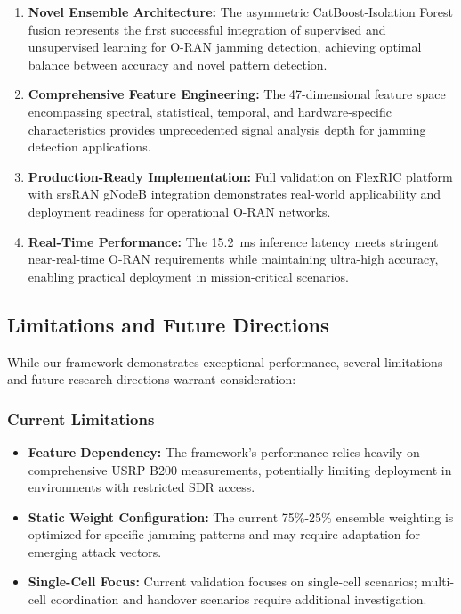 \documentclass[journal]{IEEEtran}
\begin{document}
\begin{enumerate}
    \item \textbf{Novel Ensemble Architecture:} The asymmetric CatBoost-Isolation Forest fusion represents the first successful integration of supervised and unsupervised learning for O-RAN jamming detection, achieving optimal balance between accuracy and novel pattern detection.
    
    \item \textbf{Comprehensive Feature Engineering:} The 47-dimensional feature space encompassing spectral, statistical, temporal, and hardware-specific characteristics provides unprecedented signal analysis depth for jamming detection applications.
    
    \item \textbf{Production-Ready Implementation:} Full validation on FlexRIC platform with srsRAN gNodeB integration demonstrates real-world applicability and deployment readiness for operational O-RAN networks.
    
    \item \textbf{Real-Time Performance:} The 15.2~ms inference latency meets stringent near-real-time O-RAN requirements while maintaining ultra-high accuracy, enabling practical deployment in mission-critical scenarios.
\end{enumerate}

\subsection{Limitations and Future Directions}

While our framework demonstrates exceptional performance, several limitations and future research directions warrant consideration:

\subsubsection{Current Limitations}

\begin{itemize}
    \item \textbf{Feature Dependency:} The framework's performance relies heavily on comprehensive USRP B200 measurements, potentially limiting deployment in environments with restricted SDR access.
    
    \item \textbf{Static Weight Configuration:} The current 75\%-25\% ensemble weighting is optimized for specific jamming patterns and may require adaptation for emerging attack vectors.
    
    \item \textbf{Single-Cell Focus:} Current validation focuses on single-cell scenarios; multi-cell coordination and handover scenarios require additional investigation.
\end{itemize}
\end{document}
